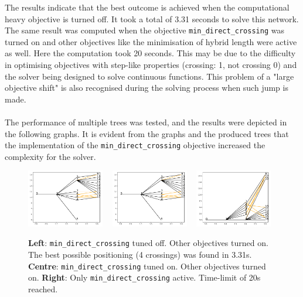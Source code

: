 \documentclass{article}
\begin{document}
The results indicate that the best outcome is achieved when the computational heavy objective is turned off. It took a total of 3.31 seconds to solve this network. 
The same result was computed when the objective \texttt{min\_direct\_crossing} was turned on and other objectives like the minimisation of hybrid length were active as well. Here the computation took 20 seconds. 
This may be due to the difficulty in optimising objectives with step-like properties (crossing: 1, not crossing 0) and the solver being designed to solve continuous functions. This problem of a "large objective shift" is also recognised during the solving process when such jump is made.\\\\
The performance of multiple trees was tested, and the results were depicted in the following graphs. It is evident from the graphs and the produced trees that the implementation of the \texttt{min\_direct\_crossing} objective increased the complexity for the solver.
\begin{figure}[H]
    \centering
    \includegraphics[width=0.3\textwidth]{figures/min_direct_crossing_off.pdf} ~ 
    \includegraphics[width=0.3\textwidth]{figures/min_direct_crossing_off.pdf} ~ \includegraphics[width=0.3\textwidth]{figures/min_direct_crossing_only.pdf}
    \caption{\textbf{Left}: \texttt{min\_direct\_crossing} tuned off. Other objectives turned on. The best possible positioning (4 crossings) was found in 3.31s. \textbf{Centre}: \texttt{min\_direct\_crossing} tuned on. Other objectives turned on.  \textbf{Right}: Only \texttt{min\_direct\_crossing} active. Time-limit of 20s reached.}
    \label{fig:min_direct_crossing}
\end{figure}
\end{document}
